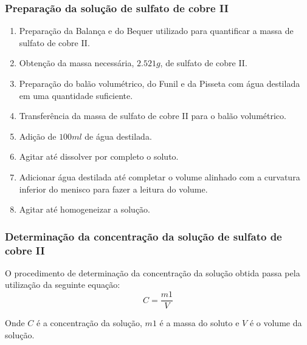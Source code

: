 \documentclass[a4paper, 11pt]{article}
\begin{document}
        \subsubsection{Preparação da solução de sulfato de cobre II}\label{sec:preparacao_solucao}
            \begin{enumerate}
                \item Preparação da Balança e do Bequer utilizado para quantificar a massa de sulfato de cobre II\@.
                \item Obtenção da massa necessária, $2.521g$, de sulfato de cobre II\@.
                \item Preparação do balão volumétrico, do Funil e da Pisseta com água destilada em uma quantidade suficiente\@.
                \item Transferência da massa de sulfato de cobre II para o balão volumétrico\@.
                \item Adição de $100ml$ de água destilada\@.
                \item Agitar até dissolver por completo o soluto\@.
                \item Adicionar água destilada até completar o volume alinhado com a curvatura inferior do menisco para fazer a leitura do volume\@.
                \item Agitar até homogeneizar a solução\@.
            \end{enumerate}
        \doublespacing

\newpage

        \subsubsection{Determinação da concentração da solução de sulfato de cobre II}\label{sec:determinacao_concentracao}
        \indent O procedimento de determinação da concentração da solução obtida passa pela utilização da seguinte equação:\\
        \begin{equation}
            \label{eq:equacao_concentracao}
            C = \frac{m1}{V}
        \end{equation}

        \indent Onde $C$ é a concentração da solução, $m1$ é a massa do soluto e $V$ é o volume da solução\@.\\
\end{document}
